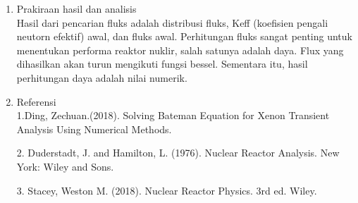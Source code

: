 \documentclass[12pt]{article}
\begin{document}
\begin{enumerate}
		\item Prakiraan hasil dan analisis \\
		Hasil dari pencarian fluks adalah distribusi fluks, Keff (koefisien pengali neutorn efektif) awal, dan fluks awal. Perhitungan fluks sangat penting untuk menentukan performa reaktor nuklir, salah satunya adalah daya. Flux yang dihasilkan akan turun mengikuti fungsi bessel. 
		Sementara itu, hasil perhitungan daya adalah nilai numerik.
		\item Referensi\\
		1.Ding, Zechuan.(2018). Solving Bateman Equation for Xenon Transient Analysis Using Numerical Methods.
		
		2. Duderstadt, J. and Hamilton, L. (1976). Nuclear Reactor Analysis. New York: Wiley and Sons.
		
		3. Stacey, Weston M. (2018). Nuclear Reactor Physics. 3rd ed. Wiley.
		
	\end{enumerate}
\end{document}
